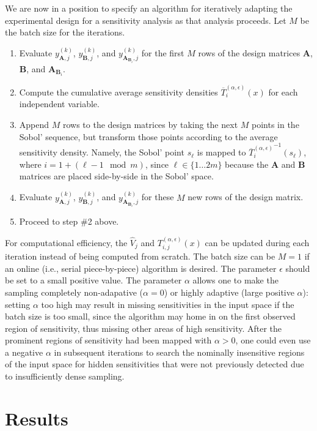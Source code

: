 \documentclass[12pt]{article}
\begin{document}
We are now in a position to specify an algorithm for iteratively adapting the experimental design for a sensitivity analysis as that analysis proceeds. Let $M$ be the batch size for the iterations.
\begin{enumerate}
    \item Evaluate $y_{\mathbf{A},j}^{(k)}$, $y_{\mathbf{B},j}^{(k)}$, and $y_{\mathbf{A}_{\mathbf{B}_i},j}^{(k)}$ for the first $M$ rows of the design matrices $\mathbf{A}$, $\mathbf{B}$, and $\mathbf{A}_{\mathbf{B}_i}$.
    \item Compute the cumulative average sensitivity densities $\overline{T}_i^{(\alpha,\epsilon)}(x)$ for each independent variable.
    \item Append $M$ rows to the design matrices by taking the next $M$ points in the Sobol' sequence, but transform those points according to the average sensitivity density. Namely, the Sobol' point $s_\ell$ is mapped to ${\overline{T}_i^{(\alpha,\epsilon)}}^{-1}(s_\ell)$, where $i = 1 + (\ell - 1 \mod m)$, since $\ell \in \{ 1 \ldots 2 m \}$ because the $\mathbf{A}$ and $\mathbf{B}$ matrices are placed side-by-side in the Sobol' space.
    \item Evaluate $y_{\mathbf{A},j}^{(k)}$, $y_{\mathbf{B},j}^{(k)}$, and $y_{\mathbf{A}_{\mathbf{B}_i},j}^{(k)}$ for these $M$ new rows of the design matrix.
    \item Proceed to step \#2 above.
\end{enumerate}
For computational efficiency, the $\hat{V}_j$ and $T_{i,j}^{(\alpha,\epsilon)}(x)$ can be updated during each iteration instead of being computed from scratch. The batch size can be $M = 1$ if an online (i.e., serial piece-by-piece) algorithm is desired. The parameter $\epsilon$ should be set to a small positive value. The parameter $\alpha$ allows one to make the sampling completely non-adapative ($\alpha = 0$) or highly adaptive (large positive $\alpha$): setting $\alpha$ too high may result in missing sensitivities in the input space if the batch size is too small, since the algorithm may home in on the first observed region of sensitivity, thus missing other areas of high sensitivity. After the prominent regions of sensitivity had been mapped with $\alpha > 0$, one could even use a negative $\alpha$ in subsequent iterations to search the nominally insensitive regions of the input space for hidden sensitivities that were not previously detected due to insufficiently dense sampling.


\section{Results}
\label{sec:result}
\end{document}
